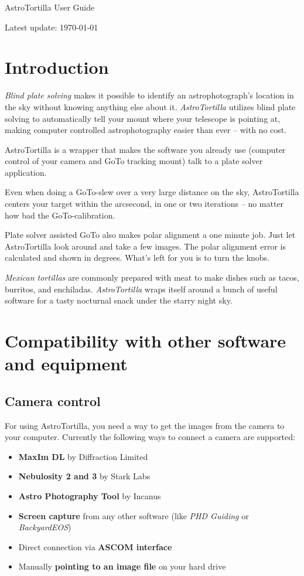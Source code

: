 \documentclass[english]{article}
\begin{document}
\centerline{\sf \Huge AstroTortilla User Guide}
\centerline{Latest update: \today}

\tableofcontents

\setlength{\parindent}{0pt}
\setlength{\parskip}{2ex}


\newpage

\section{Introduction}

\emph{Blind plate solving} makes it possible to identify an astrophotograph's location in the sky without knowing anything else about it. \emph{AstroTortilla} utilizes blind plate solving to automatically tell your mount where your telescope is pointing at, making computer controlled astrophotography easier than ever -- with no cost.

AstroTortilla is a wrapper that makes the software you already use (computer control of your camera and GoTo tracking mount) talk to a plate solver application.

Even when doing a GoTo-slew over a very large distance on the sky, AstroTortilla centers your target within the arcsecond, in one or two iterations -- no matter how bad the GoTo-calibration.

Plate solver assisted GoTo also makes polar alignment a one minute job. Just let AstroTortilla look around and take a few images. The polar alignment error is calculated and shown in degrees. What's left for you is to turn the knobs.

\emph{Mexican tortillas} are commonly prepared with meat to make dishes such as
tacos, burritos, and enchiladas. \emph{AstroTortilla} wraps itself around a
bunch of useful software for a tasty nocturnal snack under the starry night
sky.


\section{Compatibility with other software and equipment} 

\subsection{Camera control}

For using AstroTortilla, you need a way to get the images from the camera to your computer. Currently the following ways to connect a camera are supported:
\begin{itemize}
\item \textbf{MaxIm DL} by Diffraction Limited
\item \textbf{Nebulosity 2 and 3} by Stark Labs
\item \textbf{Astro Photography Tool} by Incanus
\item \textbf{Screen capture} from any other software (like \emph{PHD Guiding} or \emph{BackyardEOS})
\item Direct connection via \textbf{ASCOM interface}
\item Manually \textbf{pointing to an image file} on your hard drive
\end{itemize}
\end{document}
